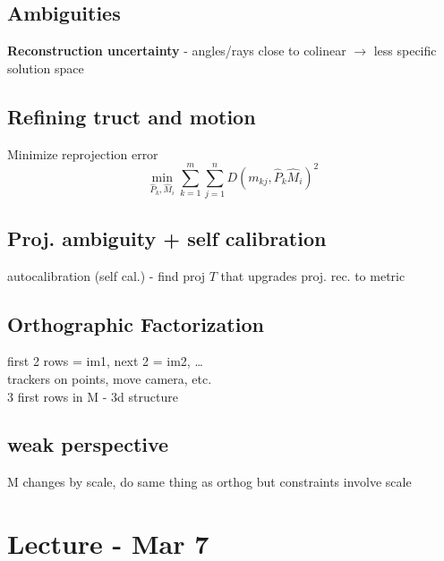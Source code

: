 \documentclass{article}
\begin{document}
\subsection{Ambiguities}
\textbf{Reconstruction uncertainty} - angles/rays close to colinear $\to$ less
specific solution space



\subsection{Refining truct and motion}
Minimize reprojection error
\[
    \min_{\hat P _k, \hat M_i} \sum_{k=1}^{m}\sum_{j=1}^{n}
    D (m_{kj}, \hat P_k \hat M_i)^2
\]

\subsection{Proj. ambiguity + self calibration}
autocalibration (self cal.) - find proj $T$ that upgrades proj. rec. to metric 



\subsection{Orthographic Factorization}
first 2 rows = im1, next 2 = im2, \dots
\\
trackers on points, move camera, etc.
\\
3 first rows in M - 3d structure

\subsection{weak perspective}
M changes by scale, do same thing as orthog but constraints involve scale 



\section{Lecture - Mar 7}
\end{document}
